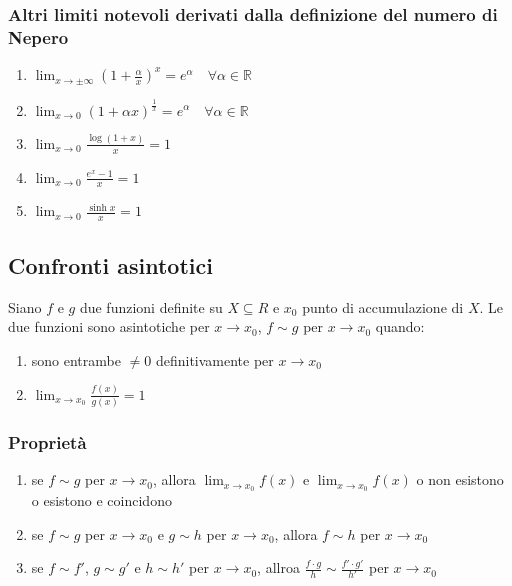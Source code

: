 \documentclass[a4paper]{article}
\begin{document}
\subsubsection*{Altri limiti notevoli derivati dalla definizione del numero di Nepero}
\begin{enumerate}
	\item \(\displaystyle \lim_{x \to \pm \infty} \left(1 + \frac{\alpha}{x} \right) ^ x = e ^ \alpha \quad \forall \alpha \in \mathbb{R}\)
	\item \(\displaystyle \lim_{x \to 0} \left( 1 + \alpha x \right) ^ \frac{1}{x} = e ^ \alpha \quad \forall \alpha \in \mathbb{R}\)
	\item \(\displaystyle \lim_{x \to 0} \frac{\log \left( 1 + x \right)}{x} = 1\)
	\item \(\displaystyle \lim_{x \to 0} \frac{ e ^ x - 1 }{x} = 1\)
	\item \(\displaystyle \lim_{x \to 0} \frac{\sinh x}{x} = 1\)
\end{enumerate}

\subsection{Confronti asintotici}
Siano \(f\) e \(g\) due funzioni definite su \(X \subseteq R\) e \(x_0\) punto di accumulazione di \(X\). Le due funzioni sono asintotiche per \(x \to x_0\),
\(f \sim g\) per \(x \to x_0\) quando:
\begin{enumerate}
	\item sono entrambe \(\neq 0\) definitivamente per \(x \to x_0\)
	\item \(\displaystyle \lim_{x \to x_0} \frac{f(x)}{g(x)} = 1\)
\end{enumerate}

\subsubsection*{Proprietà}
\begin{enumerate}
	\item se \(f \sim g\) per \(x \to x_0\), allora \(\displaystyle \lim_{x \to x_0} f(x)\) e \(\displaystyle \lim_{x \to x_0} f(x)\) o non esistono o esistono e coincidono
	\item se \(f \sim g\) per \(x \to x_0\) e \(g \sim h\) per \(x \to x_0\), allora \(f \sim h\) per \(x \to x_0\)
	\item se \(f \sim f'\), \(g \sim g'\) e \(h \sim h'\) per \(x \to x_0\), allroa \(\displaystyle \frac{f \cdot g}{h} \sim \frac{f' \cdot g'}{h'}\) per \(x \to x_0\)
\end{enumerate}
\end{document}
